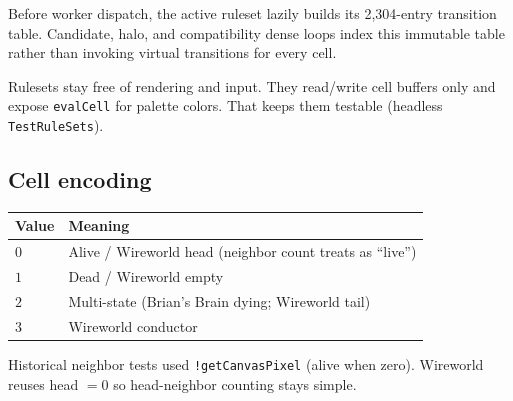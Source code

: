 Before worker dispatch, the active ruleset lazily builds its 2,304-entry
transition table. Candidate, halo, and compatibility dense loops index this
immutable table rather than invoking virtual transitions for every cell.

\begin{decisionbox}[title={Keep rules pure}]
Rulesets stay free of rendering and input. They read/write cell buffers only
and expose \texttt{evalCell} for palette colors. That keeps them testable
(headless \texttt{TestRuleSets}).
\end{decisionbox}

\subsection{Cell encoding}
\begin{center}
\begin{tabular}{@{}ll@{}}
\toprule
\textbf{Value} & \textbf{Meaning} \\
\midrule
$0$ & Alive / Wireworld head (neighbor count treats as ``live'') \\
$1$ & Dead / Wireworld empty \\
$2$ & Multi-state (Brian's Brain dying; Wireworld tail) \\
$3$ & Wireworld conductor \\
\bottomrule
\end{tabular}
\end{center}
Historical neighbor tests used \texttt{!getCanvasPixel} (alive when zero).
Wireworld reuses head $=0$ so head-neighbor counting stays simple.
